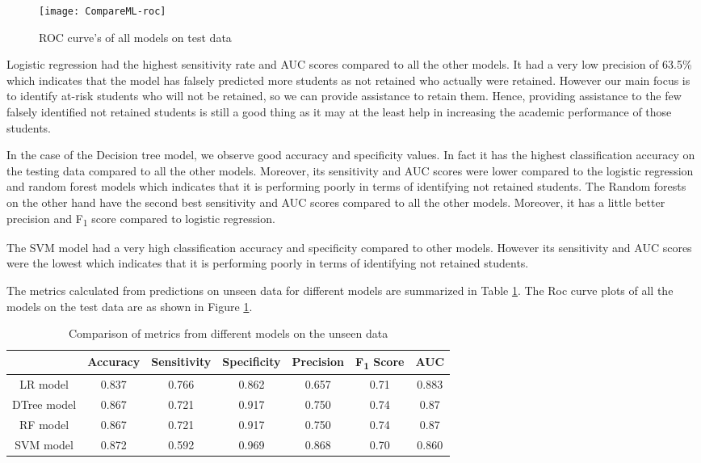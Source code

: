 \documentclass[11pt,openright]{report}
\begin{document}
 \begin{figure}[!htb]
	\centering
	\texttt{[image: CompareML-roc]}
	\caption{ROC curve's of all models on test data}
	\label{fig:comparison_roc}
\end{figure} 

Logistic regression had the highest sensitivity rate and AUC scores compared to all the other models. It had a very low precision of 63.5\% which indicates that the model has falsely predicted more students as not retained who actually were retained. However our main focus is to identify at-risk students who will not be retained, so we can provide assistance to retain them. Hence, providing assistance to the few falsely identified not retained students is still a good thing as it may at the least help in increasing the academic performance of those students. 
 
In the case of the Decision tree model, we observe good accuracy and specificity values. In fact it has the highest classification accuracy on the testing data compared to all the other models. Moreover, its sensitivity and AUC scores were lower compared to the logistic regression and random forest models which indicates that it is performing poorly in terms of identifying not retained students. The Random forests on the other hand have the second best sensitivity and AUC scores compared to all the other models. Moreover, it has a little better precision and F\textsubscript{1} score compared to logistic regression.

The SVM model had a very high classification accuracy and specificity compared to other models. However its sensitivity and AUC scores were the lowest which indicates that it is performing poorly in terms of identifying not retained students. 

The metrics calculated from predictions on unseen data for different models are summarized in Table \ref{table:compare_models_unseen_db}. The Roc curve plots of all the models on the test data are as shown in Figure \ref{fig:comparison_roc}.

\begin{table}[!htb]
	\renewcommand{\arraystretch}{1.3}
	\caption{Comparison of metrics from different models on the unseen data}
	\label{table:compare_models_unseen_db}
	\centering
	\begin{tabular}{|c|c|c|c|c|c|c|}
    \hline
  	 & \bfseries Accuracy & \bfseries Sensitivity & \bfseries Specificity & \bfseries Precision & \bfseries F\textsubscript{1} Score  & \bfseries AUC\\  
    \hline
        LR model & 0.837 & 0.766 & 0.862 & 0.657 & 0.71 & 0.883 \\ \hline
        DTree model & 0.867 & 0.721 & 0.917 & 0.750 & 0.74 & 0.87 \\ \hline
        RF model & 0.867 & 0.721 & 0.917 & 0.750 & 0.74 & 0.87 \\ \hline
        SVM model & 0.872 & 0.592 & 0.969 & 0.868 & 0.70 & 0.860 \\ \hline
	\end{tabular} 
\end{table}
\end{document}
